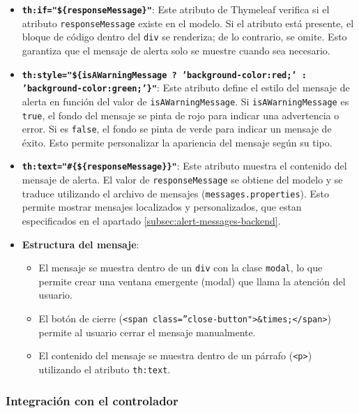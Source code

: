 \documentclass[draft]{scrbook}
\begin{document}
\begin{itemize}
    \item \textbf{\texttt{th:if="\$\{responseMessage\}"}}:
    Este atributo de Thymeleaf verifica si el atributo \texttt{responseMessage} existe en el modelo. Si el atributo está presente, el bloque de código dentro del \texttt{div} se renderiza; de lo contrario, se omite. Esto garantiza que el mensaje de alerta solo se muestre cuando sea necesario.

    \item \textbf{\texttt{th:style="\$\{isAWarningMessage ? 'background-color:red;' : 'background-color:green;'\}"}}:
    Este atributo define el estilo del mensaje de alerta en función del valor de \texttt{isAWarningMessage}. Si \texttt{isAWarningMessage} es \texttt{true}, el fondo del mensaje se pinta de rojo para indicar una advertencia o error. Si es \texttt{false}, el fondo se pinta de verde para indicar un mensaje de éxito. Esto permite personalizar la apariencia del mensaje según su tipo.

    \item \textbf{\texttt{th:text="\#\{\$\{responseMessage\}\}"}}:
    Este atributo muestra el contenido del mensaje de alerta. El valor de \texttt{responseMessage} se obtiene del modelo y se traduce utilizando el archivo de mensajes (\texttt{messages.properties}). Esto permite mostrar mensajes localizados y personalizados, que estan especificados en el apartado \ref{subsec:alert-messages-backend}.

    \item \textbf{Estructura del mensaje}:
    \begin{itemize}
        \item El mensaje se muestra dentro de un \texttt{div} con la clase \texttt{modal}, lo que permite crear una ventana emergente (modal) que llama la atención del usuario.
        \item El botón de cierre (\texttt{<span class=''close-button">\&times;</span>}) permite al usuario cerrar el mensaje manualmente.
        \item El contenido del mensaje se muestra dentro de un párrafo (\texttt{<p>}) utilizando el atributo \texttt{th:text}.
    \end{itemize}
\end{itemize}

\subsubsection{Integración con el controlador}
\end{document}
